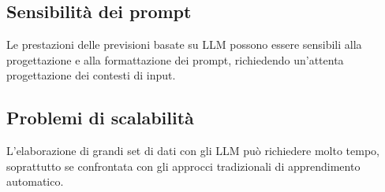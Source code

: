 \subsection{Sensibilità dei prompt}
Le prestazioni delle previsioni basate su LLM possono essere sensibili alla progettazione e alla formattazione dei prompt, richiedendo un'attenta progettazione dei contesti di input.

\subsection{Problemi di scalabilità}
L'elaborazione di grandi set di dati con gli LLM può richiedere molto tempo, soprattutto se confrontata con gli approcci tradizionali di apprendimento automatico.

